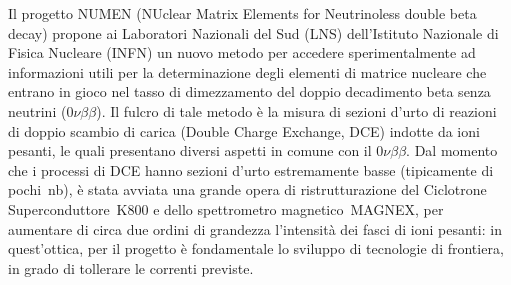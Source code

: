 \documentclass[10pt,foldmark,notumble]{leaflet}
\newcommand{\doppiobeta}{$ 0\nu\beta\beta$}
\begin{document}
Il progetto NUMEN (NUclear Matrix Elements for Neutrinoless double beta decay) propone ai Laboratori Nazionali del Sud (LNS) dell'Istituto Nazionale di Fisica Nucleare (INFN) un nuovo metodo per accedere sperimentalmente ad informazioni utili per la determinazione degli elementi di matrice nucleare che entrano in gioco nel tasso di dimezzamento del doppio decadimento beta senza neutrini (\doppiobeta).
Il fulcro di tale metodo è la misura di sezioni d'urto di reazioni di doppio scambio di carica (Double Charge Exchange, DCE) indotte da ioni pesanti, le quali presentano diversi aspetti in comune con il \doppiobeta.
%
%
%
%
Dal momento che i processi di DCE hanno sezioni d'urto estremamente basse (tipicamente di pochi~nb), è stata avviata una grande opera di ristrutturazione del Ciclotrone Superconduttore~K800 e dello spettrometro magnetico~MAGNEX, per aumentare di circa due ordini di grandezza l'intensità dei fasci di ioni pesanti: in quest'ottica, per il progetto è fondamentale lo sviluppo di tecnologie di frontiera, in grado di tollerare le correnti previste.
\end{document}
